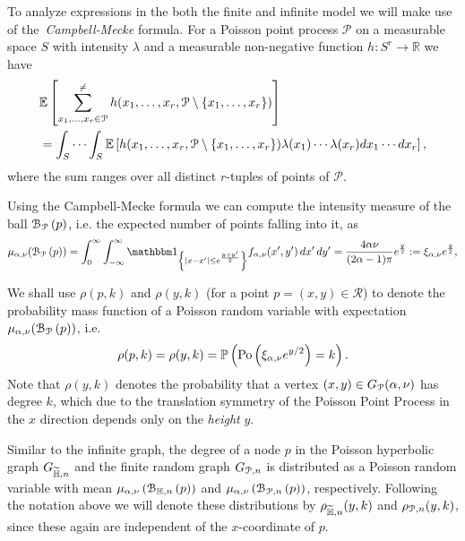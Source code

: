 To analyze expressions in the both the finite and infinite model we will make use of the~\emph{Campbell-Mecke} formula. 
For a Poisson point process $\mathcal{P}$ on a measurable space $S$ with intensity $\lambda$ and a measurable non-negative function $h: S^r \rightarrow \mathbb{R}$ we have
\begin{equation}\label{eq:def_Campbell-Mecke}
\begin{split}
& \mathbb{E}\left[\sum_{x_1,\ldots, x_r \in \mathcal{P}}^{\neq} h (x_1, \ldots, x_r,
\mathcal{P} \setminus \{x_1,\ldots, x_r\}) \right]\\
& = \int_S \cdots \int_S
\mathbb{E}\left[h(x_1,\ldots, x_r,\mathcal{P} \setminus \{x_1,\ldots, x_r\}) \lambda (x_1) \cdots \lambda (x_r) dx_1 \cdots dx_r\right],
\end{split}
\end{equation}
where the sum ranges over all distinct $r$-tuples of points of $\mathcal{P}$.

Using the Campbell-Mecke formula we can compute the intensity measure of the ball ${\mathcal B}_{{\mathcal P}}\left(p\right)$, i.e. the expected number of points falling into it, as
\begin{equation}\label{eq:mu_ball_y_P}
	\mu_{\alpha, \nu}(\BallPo{p}) = \int_0^\infty \int_{-\infty}^\infty \ind{|x-x^\prime| \le e^{\frac{y + y^\prime}{2}}}
	f_{\alpha,\nu}(x^\prime, y^\prime) \, dx^\prime \, dy^\prime 
	= \frac{4\alpha \nu}{(2\alpha - 1)\pi} e^{\frac{y}{2}} := \xi_{\alpha,\nu}e^{\frac{y}{2}},
\end{equation}

We shall use $\rho(p,k)$ and $\rho(y,k)$ (for a point $p=(x,y) \in \mathcal{R}$) to denote the probability mass function of a Poisson random variable with expectation $\mu_{\alpha, \nu}({\mathcal B}_{{\mathcal P}}\left(p\right))$, i.e.
\[
	\rho(p,k) = \rho(y,k) = \mathbb{P}\left({\mathrm{Po}}\left(\xi_{\alpha,\nu} e^{y/2}\right) = k\right).
\]
Note that $\rho(y,k)$ denotes the probability that a vertex $(x,y) \in G_{{\mathcal P}}(\alpha,\nu)$ has degree $k$, which due to the translation symmetry of the Poisson Point Process in the $x$ direction depends only on the \emph{height} $y$.

\begin{remark}
Similar to the infinite graph, the degree of a node $p$ in the Poisson hyperbolic graph $G_{\widetilde{\mathbb{H}},n}$ and the finite random graph $G_{{\mathcal P},n}$ is distributed as a Poisson random variable with mean $\mu_{\alpha,\nu}\left({\mathcal B}_{\mathbb{H},n}\left(p\right)\right)$ and $\mu_{\alpha,\nu}\left({\mathcal B}_{{\mathcal P},n}\left(p\right)\right)$, respectively. Following the notation above we will denote these distributions by $\rho_{\widetilde{\mathbb{H}},n}(y,k)$ and $\rho_{{\mathcal P},n}(y,k)$, since these again are independent of the $x$-coordinate of $p$.
\end{remark}

